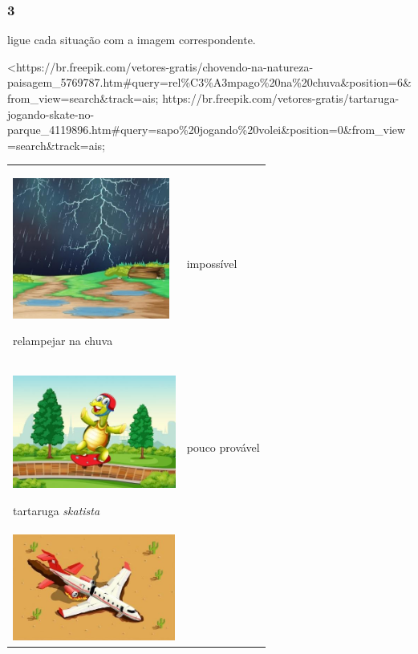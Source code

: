 \subsubsection{3}\label{section-65}

ligue cada situação com a imagem correspondente.

\textless{}https://br.freepik.com/vetores-gratis/chovendo-na-natureza-paisagem\_5769787.htm\#query=rel\%C3\%A3mpago\%20na\%20chuva\&position=6\&from\_view=search\&track=ais;
https://br.freepik.com/vetores-gratis/tartaruga-jogando-skate-no-parque\_4119896.htm\#query=sapo\%20jogando\%20volei\&position=0\&from\_view=search\&track=ais;

\begin{longtable}[]{@{}ll@{}}
\toprule
\begin{minipage}[t]{0.48\columnwidth}\raggedright\strut
\includegraphics[width=2.03487in,height=1.82023in]{media/image82.jpg}

relampejar na chuva\strut
\end{minipage} & \begin{minipage}[t]{0.48\columnwidth}\raggedright\strut
impossível\strut
\end{minipage}\tabularnewline
\begin{minipage}[t]{0.48\columnwidth}\raggedright\strut
\includegraphics[width=2.11035in,height=1.45968in]{media/image83.jpg}

tartaruga \textit{skatista}\strut
\end{minipage} & \begin{minipage}[t]{0.48\columnwidth}\raggedright\strut
pouco provável\strut
\end{minipage}\tabularnewline
\begin{minipage}[t]{0.48\columnwidth}\raggedright\strut
\includegraphics[width=2.11129in,height=1.37616in]{media/image84.jpg}


\end{minipage}
\end{longtable}
